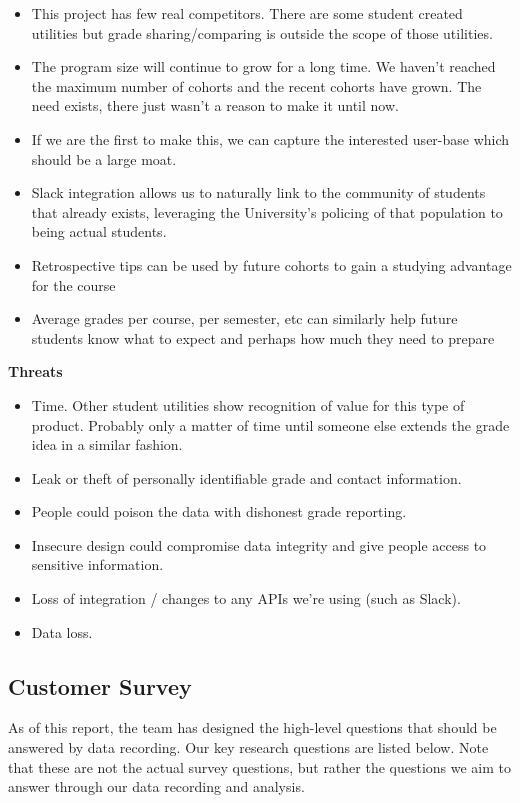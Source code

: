 \begin{itemize}
    \item This project has few real competitors. There are some student created utilities but grade sharing/comparing is outside the scope of those utilities.
    \item The program size will continue to grow for a long time. We haven't reached the maximum number of cohorts and the recent cohorts have grown. The need exists, there just wasn't a reason to make it until now.
    \item If we are the first to make this, we can capture the interested user-base which should be a large moat.
    \item Slack integration allows us to naturally link to the community of students that already exists, leveraging the University's policing of that population to being actual students.
    \item Retrospective tips can be used by future cohorts to gain a studying advantage for the course
    \item Average grades per course, per semester, etc can similarly help future students know what to expect and perhaps how much they need to prepare
\end{itemize}
\textbf{Threats}
\begin{itemize}
    \item Time. Other student utilities show recognition of value for this type of product. Probably only a matter of time until someone else extends the grade idea in a similar fashion.
    \item Leak or theft of personally identifiable grade and contact information.
    \item People could poison the data with dishonest grade reporting.
    \item Insecure design could compromise data integrity and give people access to sensitive information.
    \item Loss of integration / changes to any APIs we're using (such as Slack).
    \item Data loss.
\end{itemize}



\subsection{Customer Survey}
As of this report, the team has designed the high-level questions that should be answered by data recording. Our key research questions are listed below. Note that these are not the actual survey questions, but rather the questions we aim to answer through our data recording and analysis.

